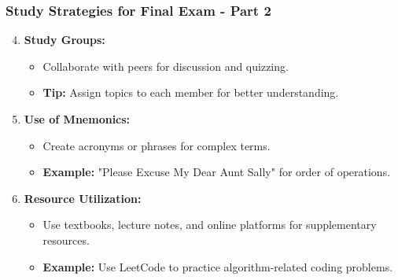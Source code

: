 \documentclass{beamer}
\begin{document}
\begin{frame}[fragile]
    \frametitle{Study Strategies for Final Exam - Part 2}
    \begin{enumerate}
        \setcounter{enumi}{3}
        \item \textbf{Study Groups:}
            \begin{itemize}
                \item Collaborate with peers for discussion and quizzing.
                \item \textbf{Tip:} Assign topics to each member for better understanding.
            \end{itemize}
        
        \item \textbf{Use of Mnemonics:}
            \begin{itemize}
                \item Create acronyms or phrases for complex terms.
                \item \textbf{Example:} "Please Excuse My Dear Aunt Sally" for order of operations.
            \end{itemize}
        
        \item \textbf{Resource Utilization:}
            \begin{itemize}
                \item Use textbooks, lecture notes, and online platforms for supplementary resources.
                \item \textbf{Example:} Use LeetCode to practice algorithm-related coding problems.
            \end{itemize}
    \end{enumerate}
\end{frame}
\end{document}

